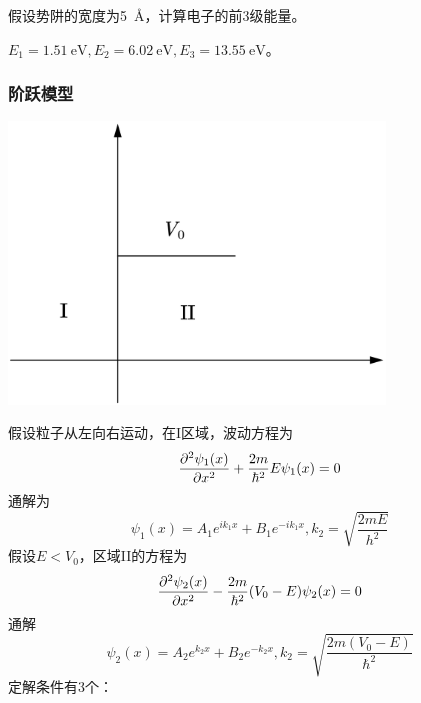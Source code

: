 \begin{exercise}
假设势阱的宽度为\qty{5}{\angstrom}，计算电子的前3级能量。
\end{exercise}
\begin{solution}
$E_1=\qty{1.51}{\eV},E_2=\qty{6.02}{\eV},E_3=\qty{13.55}{\eV}$。
\end{solution}

\subsubsection{阶跃模型}
\begin{center}
\includegraphics[width=10cm]{figure/jump-potential.png}
\end{center}
假设粒子从左向右运动，在I区域，波动方程为
\begin{equation}
\pdv[order=2]{\psi_1(x)}{x}+\frac{2m}{\hbar^2}E\psi_1(x)=0
\end{equation}
通解为
\begin{equation}
\psi_1(x)=A_1e^{ik_1x}+B_1e^{-ik_1x},k_2=\sqrt{\frac{2mE}{h^2}}
\end{equation}
假设$E<V_0$，区域II的方程为
\begin{equation}
\pdv[order=2]{\psi_2(x)}{x}-\frac{2m}{\hbar^2}(V_0-E)\psi_2(x)=0
\end{equation}
通解
$$\psi_2(x)=A_2e^{k_2x}+B_2e^{-k_2x},k_2=\sqrt{\frac{2m(V_0-E)}{\hbar^2}}$$
定解条件有3个：
